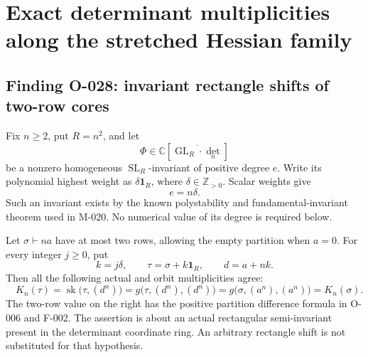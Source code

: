 \section{Exact determinant multiplicities along the stretched Hessian family}

\subsection*{Finding O-028: invariant rectangle shifts of two-row cores}
Fix \(n\geq2\), put \(R=n^2\), and let
\[
 \Phi\in\mathbb C[\overline{\operatorname{GL}_R\cdot\det_n}]
\]
be a nonzero homogeneous \(\operatorname{SL}_R\)-invariant of
positive degree \(e\).
Write its polynomial highest weight as
\(\delta\mathbf1_R\), where \(\delta\in\mathbb Z_{>0}\).
Scalar weights give
\[
                              e=n\delta.
                                                               \tag{O-028.1}
\]
Such an invariant exists by the known polystability and
fundamental-invariant theorem used in M-020.
No numerical value of its degree is required below.

Let \(\sigma\vdash na\) have at most two rows, allowing the
empty partition when \(a=0\). For every integer \(j\geq0\), put
\[
               k=j\delta,\qquad
               \tau=\sigma+k\mathbf1_R,\qquad
               d=a+nk.
                                                               \tag{O-028.2}
\]
Then all the following actual and orbit multiplicities agree:
\[
 \boxed{\quad
 K_n(\tau)
   =\operatorname{sk}\bigl(\tau,(d^n)\bigr)
   =g\bigl(\tau,(d^n),(d^n)\bigr)
   =g\bigl(\sigma,(a^n),(a^n)\bigr)
   =K_n(\sigma).
 \quad}                                                       \tag{O-028.3}
\]
The two-row value on the right has the positive partition
difference formula in O-006 and F-002.
The assertion is about an actual rectangular semi-invariant
present in the determinant coordinate ring. An arbitrary
rectangle shift is not substituted for that hypothesis.

